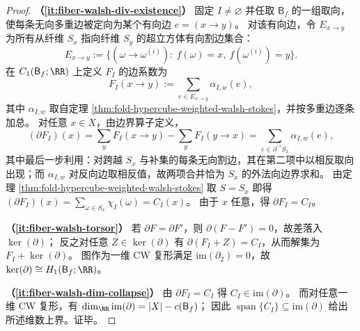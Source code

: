 \begin{proof}
\textbf{（\ref{it:fiber-walsh-div-existence}）}
固定 \(I\neq\varnothing\) 并任取 \(\mathsf B_f\) 的一组取向，使每条无向多重边被定向为某个有向边 \(e=(x\to y)\)。
对该有向边，令 \(E_{x\to y}\) 为所有从纤维 \(S_x\) 指向纤维 \(S_y\) 的超立方体有向割边集合：
\[
E_{x\to y}:=\{(\omega\to\omega^{(i)}):\ f(\omega)=x,\ f(\omega^{(i)})=y\}.
\]
在 \(C_1(\mathsf B_f;\RR)\) 上定义 \(F_I\) 的边系数为
\[
F_I(x\to y):=\sum_{e\in E_{x\to y}}\alpha_{I,w}(e),
\]
其中 \(\alpha_{I,w}\) 取自定理 \ref{thm:fold-hypercube-weighted-walsh-stokes}，并按多重边逐条加总。
对任意 \(x\in X\)，由边界算子定义，
\[
(\partial F_I)(x)
=\sum_{y}F_I(x\to y)-\sum_{y}F_I(y\to x)
=\sum_{e\in\partial^{\to}S_x}\alpha_{I,w}(e),
\]
其中最后一步利用：对跨越 \(S_x\) 与补集的每条无向割边，其在第二项中以相反取向出现；而 \(\alpha_{I,w}\) 对反向边取相反值，故两项合并恰为 \(S_x\) 的外法向边界求和。
由定理 \ref{thm:fold-hypercube-weighted-walsh-stokes} 取 \(S=S_x\) 即得
\(
(\partial F_I)(x)=\sum_{\omega\in S_x}\chi_I(\omega)=C_I(x)
\)。
由于 \(x\) 任意，得 \(\partial F_I=C_I\)。

\textbf{（\ref{it:fiber-walsh-torsor}）}
若 \(\partial F=\partial F'\)，则 \(\partial(F-F')=0\)，故差落入 \(\ker(\partial)\)；
反之对任意 \(Z\in\ker(\partial)\) 有 \(\partial(F_I+Z)=C_I\)，从而解集为 \(F_I+\ker(\partial)\)。
图作为一维 CW 复形满足 \(\mathrm{im}(\partial_2)=0\)，故 \(\ker(\partial)\cong H_1(\mathsf B_f;\RR)\)。

\textbf{（\ref{it:fiber-walsh-dim-collapse}）}
由 \(\partial F_I=C_I\) 得 \(C_I\in\mathrm{im}(\partial)\)。
而对任意一维 CW 复形，有
\(
\dim_{\RR}\mathrm{im}(\partial)=|X|-c(\mathsf B_f)
\)；
因此 \(\operatorname{span}\{C_I\}\subseteq \mathrm{im}(\partial)\) 给出所述维数上界。证毕。
\end{proof}

